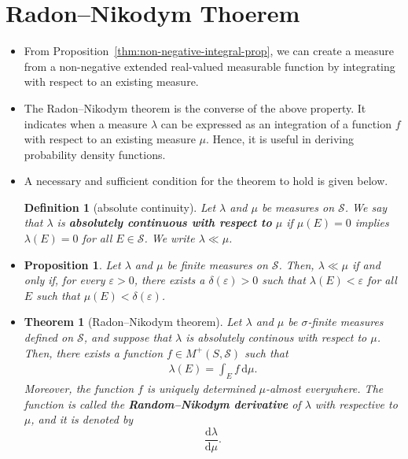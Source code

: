 \documentclass[10pt]{article}
\newtheorem{theorem}[lemma]{Theorem}
\newtheorem{definition}[lemma]{Definition}
\newtheorem{proposition}[lemma]{Proposition}
\numberwithin{lemma}{section}
\newcommand{\dee}{\mathrm{d}}
\newcommand{\mcal}[1]{\mathcal{#1}}
\begin{document}
\section{Radon--Nikodym Thoerem}

\begin{itemize}
  \item From  Proposition~\ref{thm:non-negative-integral-prop}, we can create a measure from a non-negative extended real-valued measurable function by integrating with respect to an existing measure.
  
  \item The Radon--Nikodym theorem is the converse of the above property. It indicates when a measure $\lambda$ can be expressed as an integration of a function $f$ with respect to an existing measure $\mu$. Hence, it is useful in deriving probability density functions.
  
  \item A necessary and sufficient condition for the theorem to hold is given below.
  \begin{definition}[absolute continuity]
    Let $\lambda$ and $\mu$ be measures on $\mcal{S}$. We say that $\lambda$ is {\bf absolutely continuous with respect to} $\mu$ if $\mu(E) = 0$ implies $\lambda(E) = 0$ for all $E \in \mcal{S}$. We write $\lambda \ll \mu$.
  \end{definition}

  \item \begin{proposition}
    Let $\lambda$ and $\mu$ be finite measures on $\mcal{S}$. Then, $\lambda \ll \mu$ if and only if, for every $\varepsilon > 0$, there exists a $\delta(\varepsilon) > 0$ such that $\lambda(E) < \varepsilon$ for all $E$ such that $\mu(E) < \delta(\varepsilon)$.
  \end{proposition}

  \item \begin{theorem}[Radon--Nikodym theorem]
    Let $\lambda$ and $\mu$ be $\sigma$-finite measures defined on $\mcal{S}$, and suppose that $\lambda$ is absolutely continous with respect to $\mu$. Then, there exists a function $f \in M^+(S,\mcal{S})$ such that 
    \begin{align*}
      \lambda(E) = \int_E f\, \dee\mu.
    \end{align*}
    Moreover, the function $f$ is uniquely determined $\mu$-almost everywhere. The function is called the {\bf Random--Nikodym derivative} of $\lambda$ with respective to $\mu$, and it is denoted by $$\frac{\dee \lambda}{\dee \mu}.$$
  \end{theorem}
\end{itemize}
\end{document}
